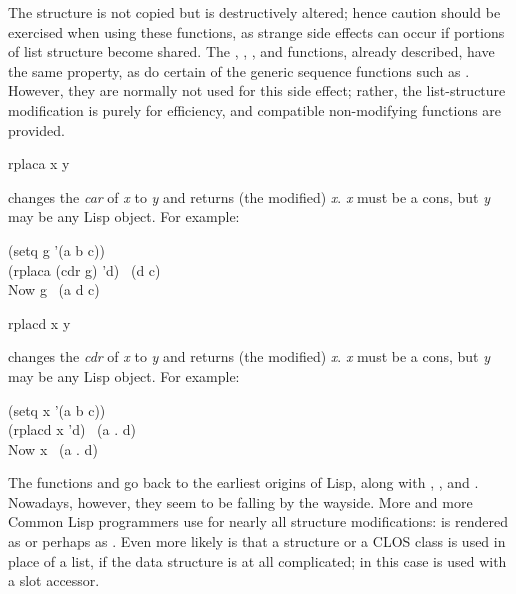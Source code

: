 The structure is not copied but is destructively altered;
hence caution should be exercised when using these functions, as
strange side effects can occur if portions of list structure become
shared.
The , , ,
and  functions, already
described,
have the same property, as do certain of the generic sequence
functions such as .
However, they are normally not
used for this side effect; rather, the list-structure modification
is purely for efficiency, and compatible non-modifying functions
are provided.

\begin{defun}[Function]
rplaca x y

 changes the {\it car} of {\it x} to {\it y} and returns
(the modified) {\it x}.  {\it x} must be a cons, but {\it y} may be any
Lisp object.
For example:
\begin{lisp}
(setq g '(a b c)) \\
(rplaca (cdr g) 'd) \EV\ (d c) \\
{\rm Now} g \EV\ (a d c)
\end{lisp}
\end{defun}

\begin{defun}[Function]
rplacd x y

 changes the {\it cdr} of {\it x} to {\it y} and returns
(the modified) {\it x}.  {\it x} must be a cons, but {\it y} may be
any Lisp object.
For example:
\begin{lisp}
(setq x '(a b c)) \\
(rplacd x 'd) \EV\ (a . d) \\
{\rm Now} x \EV\ (a . d)
\end{lisp}
\end{defun}

\begin{newer}
The functions  and  go back to the earliest
origins of Lisp, along with , , and .
Nowadays, however, they seem to be falling by the wayside.
More and more Common Lisp programmers use  for nearly
all structure modifications:  is rendered
as  or perhaps as .
Even more likely is that a  structure or a CLOS class
is used in place of a list, if the data structure is at all complicated;
in this case  is used with a slot accessor.
\end{newer}
\newpage%

